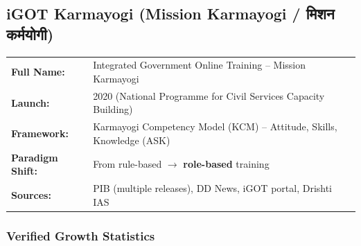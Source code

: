 \documentclass[12pt,a4paper]{article}
\newcommand{\hindi}[1]{{\hindifont #1}}
\begin{document}
\subsection{iGOT Karmayogi (Mission Karmayogi / \hindi{मिशन कर्मयोगी})}

\begin{sourcebox}
\begin{tabularx}{\textwidth}{@{}lX@{}}
\textbf{Full Name:} & Integrated Government Online Training  --  Mission Karmayogi \\
\textbf{Launch:} & 2020 (National Programme for Civil Services Capacity Building) \\
\textbf{Framework:} & Karmayogi Competency Model (KCM)  --  Attitude, Skills, Knowledge (ASK) \\
\textbf{Paradigm Shift:} & From rule-based $\rightarrow$ \textbf{role-based} training \\
\textbf{Sources:} & PIB (multiple releases), DD News, iGOT portal, Drishti IAS \\
\end{tabularx}
\end{sourcebox}

\subsubsection{Verified Growth Statistics}
\end{document}
